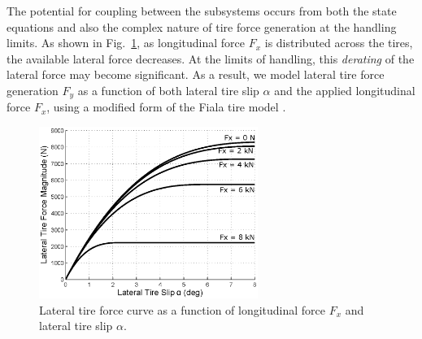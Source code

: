 \documentclass[9pt,shortpaper,twoside,web]{ieeecolor}
\begin{document}


The potential for coupling between the subsystems occurs from both the state equations and also the complex nature of tire force generation at the handling limits. As shown in Fig.~\ref{fig:coupledTires}, as longitudinal force $F_x$ is distributed across the tires, the available lateral force decreases. At the limits of handling, this \textit{derating} of the lateral force may become significant. As a result, we model lateral tire force generation $F_y$ as a function of both lateral tire slip $\alpha$ and the applied longitudinal force $F_x$, using a modified form of the Fiala tire model \cite{rami}. 
\begin{figure}[tb]
\centering
\includegraphics[width=2.8in]{figures/tirecurves.eps}
\caption{Lateral tire force curve as a function of longitudinal force $F_x$ and lateral tire slip $\alpha$.}
\label{fig:coupledTires}
\end{figure} 
\end{document}
